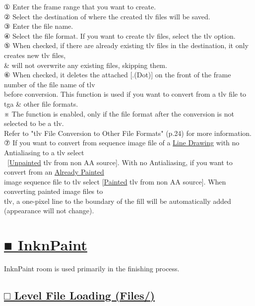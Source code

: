 \documentclass[a4paper,10pt]{article}
\begin{document}
\small
\noindent ① Enter the frame range that you want to create.\\
② Select the destination of where the created tlv files will be saved.\\
③ Enter the file name.\\
④ Select the file format. If you want to create tlv files, select the tlv option.\\
⑤ When checked, if there are already existing tlv files in the destination, it only creates new tlv files,\\
\& will not overwrite any existing files, skipping them.\\
⑥ When checked, it deletes the attached [.(Dot)] on the front of the frame number of the file name of tlv\\
before conversion. This function is used if you want to convert from a tlv file to tga \& other file formats.\\
※ The function is enabled, only if the file format after the conversion is not selected to be a tlv.\\
Refer to "tlv File Conversion to Other File Formats" (p.24) for more information.\\
⑦ If you want to convert from sequence image file of a \uline{Line Drawing} with no Antialiasing to a tlv select\\
\ [\uline{Unpainted} tlv from non AA source]. With no Antialiasing, if you want to convert from an \uline{Already Painted}\\
image sequence file to tlv select [\uline{Painted} tlv from non AA source]. When converting painted image files to\\
tlv, a one-pixel line to the boundary of the fill will be automatically added (appearance will not change).

\newpage

\section*{\uline{■ InknPaint}}

\noindent InknPaint room is used primarily in the finishing process.\\[-0.3em]

\subsection*{\uline{□ Level File Loading (Files/)}}
\end{document}
